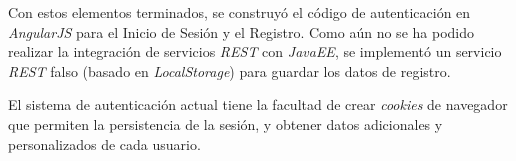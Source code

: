 \documentclass{memoria}
\begin{document}

Con estos elementos terminados, se construyó el código de autenticación en \textsl{AngularJS} para el Inicio de Sesión y el Registro. Como aún no se ha podido realizar la integración de servicios \textsl{REST} con \textsl{JavaEE}, se implementó un servicio \textsl{REST} falso (basado en \textsl{LocalStorage}) para guardar los datos de registro.


El sistema de autenticación actual tiene la facultad de crear \textsl{cookies} de navegador que permiten la persistencia de la sesión, y obtener datos adicionales y personalizados de cada usuario.

\end{document}
